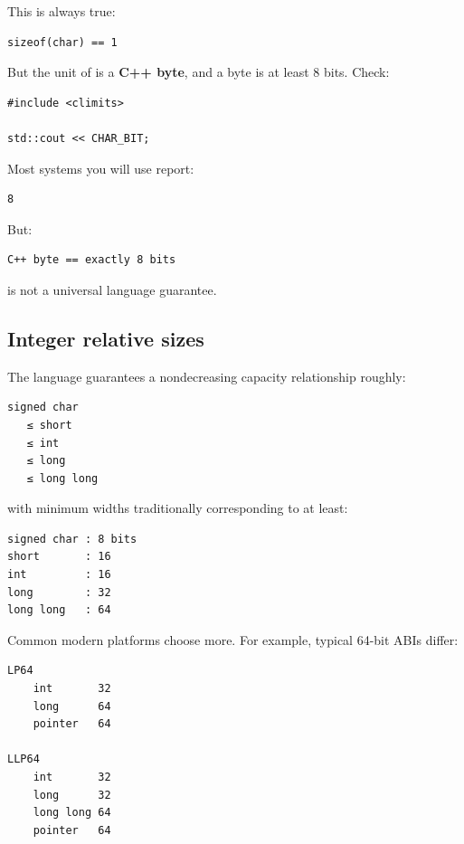 This is always true:

\begin{verbatim}
sizeof(char) == 1
\end{verbatim}

But the unit of  is a \textbf{C++ byte}, and a byte is at least 8 bits. Check:

\begin{verbatim}
#include <climits>

std::cout << CHAR_BIT;
\end{verbatim}

Most systems you will use report:

\begin{verbatim}
8
\end{verbatim}

But:

\begin{verbatim}
C++ byte == exactly 8 bits
\end{verbatim}

is not a universal language guarantee.

\subsection{Integer relative sizes}\label{05-engine-i-ch002-integer-relative-sizes}

\hypertarget{05-engine-i-ch002-integer-relative-sizes}{}

The language guarantees a nondecreasing capacity relationship roughly:

\begin{verbatim}
signed char
   ≤ short
   ≤ int
   ≤ long
   ≤ long long
\end{verbatim}

with minimum widths traditionally corresponding to at least:

\begin{verbatim}
signed char : 8 bits
short       : 16
int         : 16
long        : 32
long long   : 64
\end{verbatim}

Common modern platforms choose more. For example, typical 64-bit ABIs differ:

\begin{verbatim}
LP64
    int       32
    long      64
    pointer   64

LLP64
    int       32
    long      32
    long long 64
    pointer   64
\end{verbatim}

